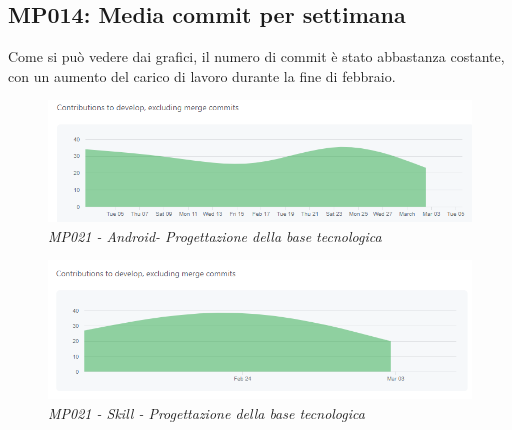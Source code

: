\subsection{MP014: Media commit per settimana}
Come si può vedere dai grafici, il numero di commit è stato abbastanza costante, con un aumento del carico di lavoro durante la fine di febbraio.
\begin{figure} [h]
    \centering
	\includegraphics[scale=0.5]{./images/dailycommits_kotlin.PNG}
    \caption{\textit{MP021 - Android- Progettazione della base tecnologica}}\label{}
\end{figure}
\begin{figure} [h]
    \centering
	\includegraphics[scale=0.5]{./images/daycommits_js.PNG}
    \caption{\textit{MP021 - Skill - Progettazione della base tecnologica}}\label{}
\end{figure}

